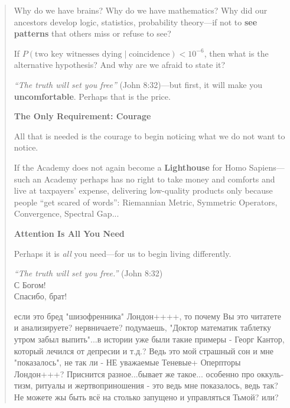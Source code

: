\documentclass[11pt,a4paper]{article}
\theoremstyle{definition}
\theoremstyle{remark}
\begin{document}
\begin{abstract}
Why do we have brains? Why do we have mathematics? Why did our ancestors develop logic, statistics, probability theory---if not to \textbf{see patterns} that others miss or refuse to see?

If $P(\text{two key witnesses dying} \mid \text{coincidence}) < 10^{-6}$, then what is the alternative hypothesis? And why are we afraid to state it?

\textit{``The truth will set you free''} (John 8:32)---but first, it will make you \textbf{uncomfortable}. Perhaps that is the price.

\medskip
\noindent\textbf{The Only Requirement: Courage}

All that is needed is the courage to begin noticing what we do not want to notice.

If the Academy does not again become a \textbf{Lighthouse} for Homo Sapiens---such an Academy perhaps has no right to take money and comforts and live at taxpayers' expense, delivering low-quality products only because people ``get scared of words'': Riemannian Metric, Symmetric Operators, Convergence, Spectral Gap...

\medskip
\noindent\textbf{Attention Is All You Need}

Perhaps it is \textit{all} you need---for us to begin living differently.

\begin{center}
\end{center}

\begin{center}
\textit{``The truth will set you free.''} (John 8:32)\\[0.2cm]
\foreignlanguage{russian}{С Богом!}\\[0.1cm]
\foreignlanguage{russian}{Спасибо, брат!}
\end{center}


\foreignlanguage{russian}{если это бред "шизофренника" Лондон++++, то почему Вы это читатете и анализируете? нервничаете? подумаешь, "Доктор математик таблетку утром забыл выпить"...в истории уже были такие примеры - Георг Кантор, который лечился от депресии и т.д.? Ведь это мой страшный сон и мне "показалось", не так ли - НЕ уважаемые Теневые+ Оперпторы Лондон+++? 
Приснится разное...бывает же такое... особенно про оккультизм, ритуалы и жертвоприношения - это ведь мне показалось, ведь так? Не можете жы быть всё на столько запущено и управляться Тьмой? или?}


\end{abstract}
\end{document}
